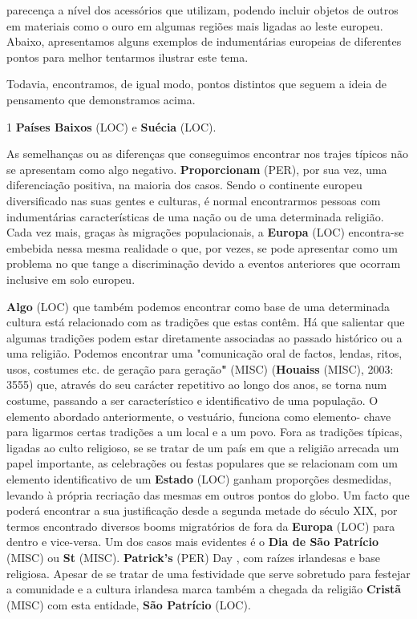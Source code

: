 \documentclass[12pt,a4paper]{article}
\begin{document}
parecença  a  nível  dos  acessórios  que  utilizam,  podendo  incluir  objetos  de  outros  em materiais  como  o  ouro  em  algumas  regiões  mais  ligadas  ao  leste  europeu.  Abaixo, apresentamos  alguns  exemplos  de  indumentárias  europeias  de  diferentes  pontos  para melhor tentarmos ilustrar este tema.

Todavia,  encontramos,  de  igual  modo,  pontos  distintos  que  seguem  a  ideia  de pensamento que demonstramos acima.

1 \textbf{Países Baixos} (LOC) e \textbf{Suécia} (LOC).

As semelhanças ou as diferenças que conseguimos encontrar nos trajes típicos não se  apresentam  como  algo  negativo.  \textbf{Proporcionam} (PER),  por  sua  vez,  uma  diferenciação positiva, na maioria dos casos. Sendo o continente europeu diversificado nas suas gentes e  culturas,  é  normal  encontrarmos  pessoas  com  indumentárias  características  de  uma nação ou de uma determinada religião. Cada vez mais, graças às migrações populacionais, a  \textbf{Europa} (LOC)  encontra-se  embebida  nessa  mesma  realidade  o  que,  por  vezes,  se  pode apresentar como um problema no que tange a discriminação devido a eventos anteriores que ocorram inclusive em solo europeu.

\textbf{Algo} (LOC) que também podemos encontrar como base de uma determinada cultura está relacionado com as tradições que estas contêm. Há que salientar que algumas tradições podem  estar  diretamente  associadas  ao  passado  histórico  ou  a  uma  religião.  Podemos encontrar uma "comunicação oral de factos, lendas, ritos, usos, costumes etc. de geração para geração\textbf{"} (MISC) (\textbf{Houaiss} (MISC), 2003: 3555) que, através do seu carácter repetitivo ao longo dos anos,  se  torna  num  costume,  passando  a  ser  característico  e  identificativo  de  uma população. O elemento  abordado  anteriormente, o vestuário,  funciona como  elemento- chave para ligarmos certas tradições a um local e a um povo. Fora as tradições típicas, ligadas ao culto religioso, se se tratar de um país em que a religião arrecada um papel importante,  as  celebrações  ou  festas  populares  que  se  relacionam  com  um  elemento identificativo de um \textbf{Estado} (LOC) ganham proporções desmedidas, levando à própria recriação das mesmas em outros pontos do globo. Um facto que poderá encontrar a sua justificação desde  a  segunda  metade  do  século  XIX,  por  termos  encontrado  diversos booms migratórios de fora da \textbf{Europa} (LOC) para dentro e vice-versa. Um dos casos mais evidentes é o \textbf{Dia de São Patrício} (MISC) ou \textbf{St} (MISC). \textbf{Patrick's} (PER) Day , com raízes irlandesas e base religiosa. Apesar de se tratar de uma festividade que serve sobretudo para festejar a comunidade e a cultura irlandesa  marca  também  a  chegada  da  religião  \textbf{Cristã} (MISC)  com  esta  entidade,  \textbf{São  Patrício} (LOC).
\end{document}
